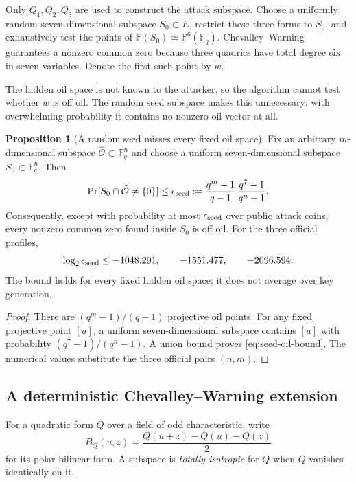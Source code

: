 \documentclass[11pt,a4paper]{article}
\theoremstyle{definition}
\newtheorem{proposition}[theorem]{Proposition}
\theoremstyle{remark}
\newcommand{\F}{\mathbb F}
\newcommand{\PP}{\mathbb P}
\newcommand{\cO}{\mathcal O}
\begin{document}
Only $Q_1,Q_2,Q_3$ are used to construct the attack subspace.  Choose a
uniformly random seven-dimensional subspace $S_0\subset E$, restrict these
three forms to $S_0$, and exhaustively test the points of
$\PP(S_0)\simeq\PP^6(\F_q)$.  Chevalley--Warning guarantees a nonzero common
zero because three quadrics have total degree six in seven variables.  Denote
the first such point by $w$.

The hidden oil space is not known to the attacker, so the algorithm cannot
test whether $w$ is off oil.  The random seed subspace makes this unnecessary:
with overwhelming probability it contains no nonzero oil vector at all.

\begin{proposition}[A random seed misses every fixed oil space]\label{prop:off-oil-seed}
Fix an arbitrary $m$-dimensional subspace $\widehat{\cO}\subset\F_q^n$ and
choose a uniform seven-dimensional subspace $S_0\subset\F_q^n$.  Then
\begin{equation}\label{eq:seed-oil-bound}
 \Pr[S_0\cap\widehat{\cO}\ne\{0\}]
 \le
 \epsilon_{\rm seed}
 :=\frac{q^m-1}{q-1}\,
   \frac{q^7-1}{q^n-1}.
\end{equation}
Consequently, except with probability at most $\epsilon_{\rm seed}$ over
public attack coins, every nonzero common zero found inside $S_0$ is off oil.
For the three official profiles,
\begin{equation}\label{eq:seed-oil-numbers}
 \log_2\epsilon_{\rm seed}
 \le -1048.291,\qquad-1551.477,\qquad-2096.594.
\end{equation}
The bound holds for every fixed hidden oil space; it does not average over key
generation.
\end{proposition}

\begin{proof}
There are $(q^m-1)/(q-1)$ projective oil points.  For any fixed projective
point $[u]$, a uniform seven-dimensional subspace contains $[u]$ with
probability $(q^7-1)/(q^n-1)$.  A union bound proves
\eqref{eq:seed-oil-bound}.  The numerical values substitute the three official
pairs $(n,m)$.
\end{proof}

\subsection{A deterministic Chevalley--Warning extension}

For a quadratic form $Q$ over a field of odd characteristic, write
\[
 B_Q(u,z)=\frac{Q(u+z)-Q(u)-Q(z)}2
\]
for its polar bilinear form.  A subspace is \emph{totally isotropic} for $Q$ when $Q$ vanishes identically on it.
\end{document}
